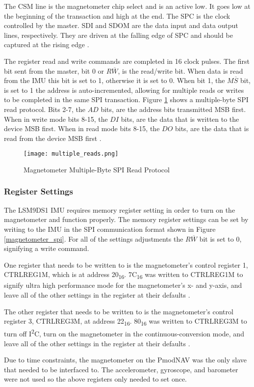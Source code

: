 The CS\textunderscore{}M line is the magnetometer chip select and is an active low. It goes low at the beginning of the transaction and high at the end. The SPC is the clock controlled by the master. SDI and SDO\textunderscore{}M are the data input and data output lines, respectively. They are driven at the falling edge of SPC and should be captured at the rising edge \cite{lsm9ds1}.
\par
The register read and write commands are completed in 16 clock pulses. The first bit sent from the master, bit 0 or $R\overline{W}$, is the read/write bit. When data is read from the IMU this bit is set to 1, otherwise it is set to 0. When bit 1, the $M\overline{S}$ bit, is set to 1 the address is auto-incremented, allowing for multiple reads or writes to be completed in the same SPI transaction. Figure \ref{multiple_reads} shows a multiple-byte SPI read protocol. Bits 2-7, the $AD$ bits, are the address bits transmitted MSB first. When in write mode bits 8-15, the $DI$ bits, are the data that is written to the device MSB first. When in read mode bits 8-15, the $DO$ bits, are the data that is read from the device MSB first \cite{lsm9ds1}.

\begin{figure}[H]
	\centerline{\texttt{[image: multiple\_reads.png]}}
	\caption{Magnetometer Multiple-Byte SPI Read Protocol \cite{lsm9ds1}}
	\label{multiple_reads}
\end{figure}

\subsubsection{Register Settings} \label{imu_settings}
The LSM9DS1 IMU requires memory register setting in order to turn on the magnetometer and function properly. The memory register settings can be set by writing to the IMU in the SPI communication format shown in Figure \ref{magnetometer_spi}. For all of the settings adjustments the $R\overline{W}$ bit is set to 0, signifying a write command.
\par
One register that needs to be written to is the magnetometer's control register 1, CTRL\textunderscore{}REG\textunderscore{}1\textunderscore{}M, which is at address 20\textsubscript{16}. 7C\textsubscript{16} was written to CTRL\textunderscore{}REG\textunderscore{}1\textunderscore{}M to signify ultra high performance mode for the magnetometer's x- and y-axis, and leave all of the other settings in the register at their defaults \cite{lsm9ds1}.
\par
The other register that needs to be written to is the magnetometer's control register 3, CTRL\textunderscore{}REG\textunderscore{}3\textunderscore{}M, at address 22\textsubscript{16}. 80\textsubscript{16} was written to CTRL\textunderscore{}REG\textunderscore{}3\textunderscore{}M to turn off I\textsuperscript{2}C, turn on the magnetometer in the continuous-conversion mode, and leave all of the other settings in the register at their defaults \cite{lsm9ds1}.
\par
Due to time constraints, the magnetometer on the PmodNAV was the only slave that needed to be interfaced to. The accelerometer, gyroscope, and barometer were not used so the above registers only needed to set once.

